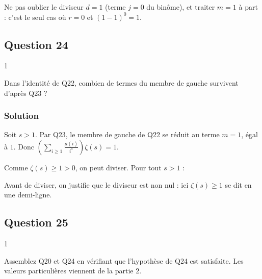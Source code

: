 \documentclass[11pt,a4paper]{article}
\newcommand{\equationajustee}[1]{%
  \sbox{\boiteequation}{$\displaystyle #1$}%
  \ifdim\wd\boiteequation>\linewidth
    \[\resizebox{\linewidth}{!}{\usebox{\boiteequation}}\]%
  \else
    \[#1\]%
  \fi}
\begin{document}
\begin{piege}

Ne pas oublier le diviseur \(d=1\) (terme \(j=0\) du binôme), et traiter \(m=1\) à part : c'est le seul cas où \(r=0\) et \((1-1)^0=1\).

\end{piege}

\hypertarget{question-24}{%
\subsection{Question 24}\label{question-24}}

\begin{indication}{1}

Dans l'identité de Q22, combien de termes du membre de gauche survivent d'après Q23 ?

\end{indication}

\hypertarget{solution-23}{%
\subsubsection{Solution}\label{solution-23}}

Soit \(s>1\). Par Q23, le membre de gauche de Q22 se réduit au terme \(m=1\), égal à \(1\). Donc \(\left(\sum_{i\ge1}\frac{\mu(i)}{i^s}\right)\zeta(s)=1\).

Comme \(\zeta(s)\ge1>0\), on peut diviser. Pour tout \(s>1\) :
\equationajustee{\boxed{\sum_{i=1}^{+\infty}\frac{\mu(i)}{i^s}=\frac{1}{\zeta(s)}.}}

\begin{methode}

Avant de diviser, on justifie que le diviseur est non nul : ici \(\zeta(s)\ge1\) se dit en une demi-ligne.

\end{methode}

\hypertarget{question-25}{%
\subsection{Question 25}\label{question-25}}

\begin{indication}{1}

Assemblez Q20 et Q24 en vérifiant que l'hypothèse de Q24 est satisfaite. Les valeurs particulières viennent de la partie 2.

\end{indication}
\end{document}
